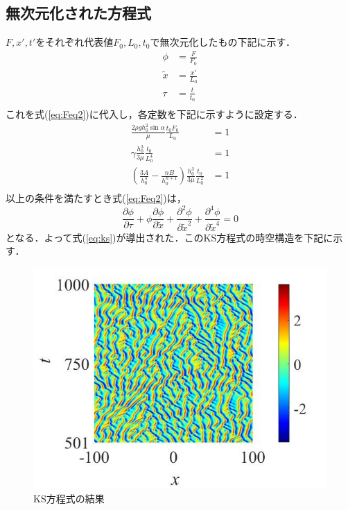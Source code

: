 \documentclass[autodetect-engine,dvipdfmx-if-dvi,ja=standard,a4paper,11pt]{bxjsarticle} %
\begin{document}
\subsection{無次元化された方程式}
$F,x',t'$をそれぞれ代表値$F_0,L_0,t_0$で無次元化したもの下記に示す．
\begin{equation}
\begin{split}
\phi&=\frac{F}{F_0}\\
\tilde{x}&=\frac{x'}{L_0}\\
\tau&=\frac{t}{t_0}\\
\label{eq:norm}
\end{split}
\end{equation}
これを式(\ref{eq:Feq2})に代入し，各定数を下記に示すように設定する．
\begin{equation}
\begin{split}
\frac{2\rho gh_0^2\sin\alpha}{\mu}\frac{t_0F_0}{L_0}&=1\\
\gamma\frac{h_0^3}{3\mu}\frac{t_0}{L_0^4}&=1\\
\left(\frac{3A}{h_0^4}-\frac{nB}{h_0^{n+1}}\right)\frac{h_0^3}{3\mu}\frac{t_0}{L_0^2}&=1\\
\label{eq:para}
\end{split}
\end{equation}
以上の条件を満たすとき式(\ref{eq:Feq2})は，
\begin{equation}
\frac{\partial\phi}{\partial\tau}+\phi\frac{\partial\phi}{\partial\tilde{x}}+\frac{\partial^2\phi}{\partial\tilde{x}^2}+\frac{\partial^4\phi}{\partial\tilde{x}^4}=0
\label{eq:phieq}
\end{equation}
となる．よって式(\ref{eq:ks})が導出された．このKS方程式の時空構造を下記に示す．

\begin{figure}[H]%
\begin{center}
\includegraphics[width=.4\textwidth]{KS_result.jpg} 
\end{center}
\caption{KS方程式の結果}%
\label{fig:ks}%
\end{figure}
\end{document}
